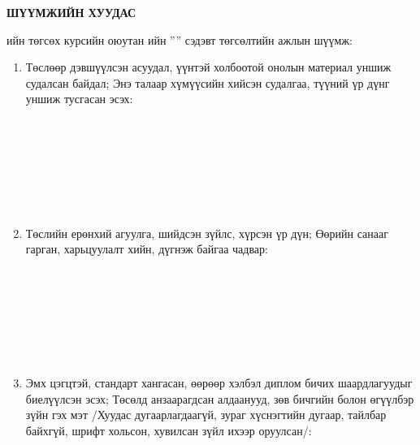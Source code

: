 \newpage

\begin{titlepage}
\begin{center}

{\scshape\Large \univname\par} %
{\scshape\large \facname\par}\vspace{1cm} %

\textbf{{\Large ШҮҮМЖИЙН ХУУДАС}}\\[1cm]

\end{center}

\normalsize

\deptname\-ийн төгсөх курсийн оюутан \shortname\-ийн ''\ttitle'' сэдэвт төгсөлтийн ажлын шүүмж:

\begin{enumerate}
\item Төслөөр дэвшүүлсэн асуудал, үүнтэй холбоотой онолын материал уншиж судалсан байдал; Энэ талаар хүмүүсийн хийсэн судалгаа, түүний үр дүнг уншиж тусгасан эсэх:
\begin{center}
\dotfill \\[0.1cm]
\dotfill \\[0.1cm]
\dotfill \\[0.1cm]
\dotfill \\[0.1cm]
\dotfill \\[0.1cm]
\dotfill \\[0.4cm]
\end{center}

\item Төслийн ерөнхий агуулга, шийдсэн зүйлс, хүрсэн үр дүн; Өөрийн санааг гарган, харьцуулалт хийн, дүгнэж байгаа чадвар:
\begin{center}
\dotfill \\[0.1cm]
\dotfill \\[0.1cm]
\dotfill \\[0.1cm]
\dotfill \\[0.1cm]
\dotfill \\[0.1cm]
\dotfill \\[0.4cm]
\end{center}

\item Эмх цэгцтэй, стандарт хангасан, өөрөөр хэлбэл диплом бичих шаардлагуудыг биелүүлсэн эсэх; Төсөлд анзаарагдсан алдаанууд, зөв бичгийн болон өгүүлбэр зүйн гэх мэт /Хуудас дугаарлагдаагүй, зураг хүснэгтийн дугаар, тайлбар байхгүй, шрифт хольсон, хувилсан зүйл ихээр оруулсан/:
\begin{center}
\dotfill \\[0.1cm]
\dotfill \\[0.1cm]
\dotfill \\[0.1cm]
\dotfill \\[0.1cm]
\dotfill \\[0.1cm]
\dotfill \\[0.4cm]
\end{center}


\end{enumerate}
\end{titlepage}
